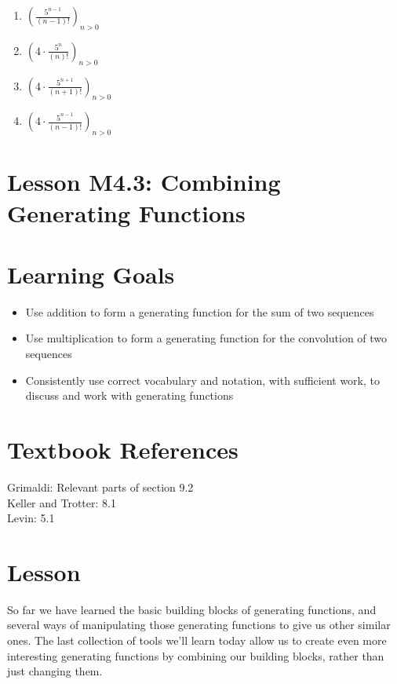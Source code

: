 \documentclass{article}
\theoremstyle{definition}
\begin{document}
\begin{enumerate}
  \begin{enumerate}
    \item $\left(\frac{5^{n-1}}{(n-1)!}\right)_{n>0}$
    \item $\left(4 \cdot \frac{5^n}{(n)!}\right)_{n > 0}$
    \item $\left(4 \cdot \frac{5^{n+1}}{(n+1)!}\right)_{n > 0}$
    \item $\left(4 \cdot \frac{5^{n-1}}{(n-1)!}\right)_{n > 0}$
  \end{enumerate}



\end{enumerate}











\newpage



\section*{Lesson M4.3: Combining Generating Functions}
\section*{Learning Goals}
\begin{itemize}
  \item Use addition to form a generating function for the sum of two sequences
  \item Use multiplication to form a generating function for the convolution of two sequences
  \item Consistently use correct vocabulary and notation, with sufficient work, to discuss and work with generating functions
\end{itemize}

\section*{Textbook References}
Grimaldi: Relevant parts of section 9.2\\
Keller and Trotter: 8.1\\
Levin: 5.1

\section*{Lesson}
So far we have learned the basic building blocks of generating functions, and several ways of manipulating those generating functions to give us other similar ones. The last collection of tools we'll learn today allow us to create even more interesting generating functions by combining our building blocks, rather than just changing them.
\end{document}
